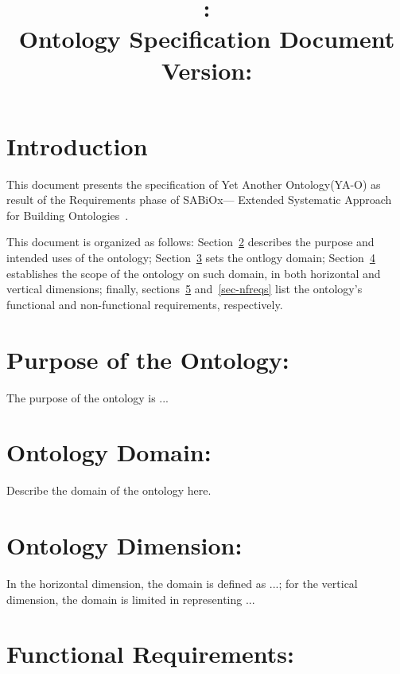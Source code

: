 \documentclass[table,usenames,dvipsnames]{article}
\title{\ontologyacronym: \ontologyname
	\\{\large Ontology Specification Document}
	\\{\normalsize Version: \documentversion}}
\author{\authorname}
\newcommand{\sabiox}{SABiOx\xspace}
\newcommand{\sabioxfull}{Extended Systematic Approach for Building Ontologies\xspace}
\newcommand{\ontologyacronym}{YA-O\xspace}
\newcommand{\ontologyname}{Yet Another Ontology\xspace}
\begin{document}
\maketitle


\section{Introduction}

This document presents the specification of \ontologyname (\ontologyacronym) as result of the Requirements phase of \sabiox --- \sabioxfull~\cite{aguiar-souza:report24}.

This document is organized as follows:
Section~\ref{sec-purpose} describes the purpose and intended uses of the ontology;
Section~\ref{sec-domain} sets the ontlogy domain;
Section~\ref{sec-dimension} establishes the scope of the ontology on such domain, in both horizontal and vertical dimensions; finally, 
sections~\ref{sec-freqs} and~\ref{sec-nfreqs} list the ontology's functional and non-functional requirements, respectively.



\section{Purpose of the Ontology:}
\label{sec-purpose}

The purpose of the ontology is ...



\section{Ontology Domain:}
\label{sec-domain}

Describe the domain of the ontology here.



\section{Ontology Dimension:}
\label{sec-dimension}

In the horizontal dimension, the domain is defined as ...; for the vertical dimension, the domain is limited in representing ...



\section{Functional Requirements:}
\label{sec-freqs}
\end{document}
